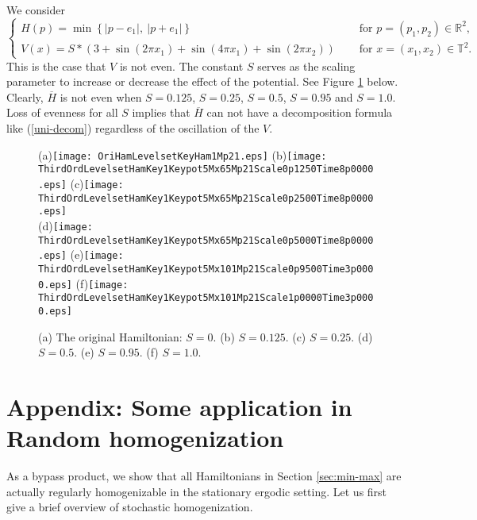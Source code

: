 \documentclass[12pt,reqno]{amsart}
\theoremstyle{plain}
\theoremstyle{remark}
\numberwithin{equation}{section}
\newcommand{\R}{\mathbb{R}}
\newcommand{\T}{\mathbb{T}}
\newcommand{\ol}{\overline}
\begin{document}
  We consider 
\begin{equation*}\label{eq-dw3}
\begin{cases}
H(p)=\min \left\{|p-e_1|, \  |p+e_1|\right\} \quad &\text{ for } p=(p_1,p_2)\in \R^2,\\
V(x)=S * \left(3+\sin (2\pi x_1)+\sin (4\pi x_1)+\sin (2\pi x_2)\right) \quad &\text{ for } x=(x_1,x_2) \in \T^2.
\end{cases}
\end{equation*}
This is the case that $V$ is not even. The constant $S$ serves as the scaling parameter to increase or decrease the effect of the potential. See Figure \ref{qtyEx1_5_weno3d} below. Clearly, $\ol H$ is not even when $S=0.125$,   $S=0.25$, $S=0.5$, $S=0.95$ and $S=1.0$. Loss of evenness for all $S$ implies that $\ol H$ can not  have a decomposition formula like (\ref{uni-decom}) regardless of the oscillation of the $V$.  
 
\begin{figure}[htb]
 \centering
 (a){\texttt{[image: OriHamLevelsetKeyHam1Mp21.eps]}}
 (b){\texttt{[image: ThirdOrdLevelsetHamKey1Keypot5Mx65Mp21Scale0p1250Time8p0000.eps]}}
 (c){\texttt{[image: ThirdOrdLevelsetHamKey1Keypot5Mx65Mp21Scale0p2500Time8p0000.eps]}}\\
 (d){\texttt{[image: ThirdOrdLevelsetHamKey1Keypot5Mx65Mp21Scale0p5000Time8p0000.eps]}} 
 (e){\texttt{[image: ThirdOrdLevelsetHamKey1Keypot5Mx101Mp21Scale0p9500Time3p0000.eps]}}
 (f){\texttt{[image: ThirdOrdLevelsetHamKey1Keypot5Mx101Mp21Scale1p0000Time3p0000.eps]}}\\  
\caption{(a) The original Hamiltonian: $S=0$. (b) $S=0.125$. (c) $S=0.25$. (d) $S=0.5$. (e) $S=0.95$. (f) $S=1.0$.}
\label{qtyEx1_5_weno3d}
\end{figure}





\section{Appendix: Some application in Random homogenization}\label{sec:Appen}
As a bypass product, we show that all Hamiltonians in Section \ref{sec:min-max}
are actually regularly homogenizable in the stationary ergodic setting.
Let us first give a brief overview of stochastic homogenization.
\end{document}
